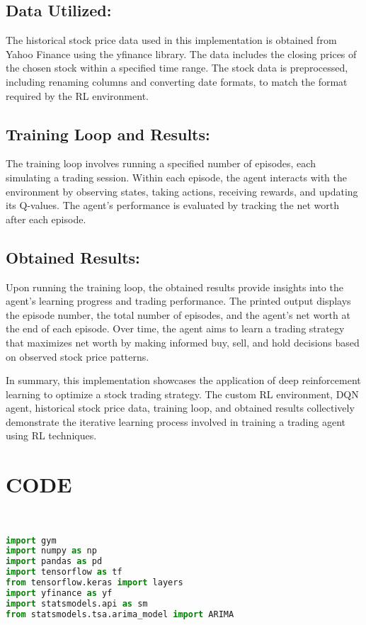 \documentclass{article}
\begin{document}
\subsection{Data Utilized:}
The historical stock price data used in this implementation is obtained from Yahoo Finance using the yfinance library. The data includes the closing prices of the chosen stock within a specified time range. The stock data is preprocessed, including renaming columns and converting date formats, to match the format required by the RL environment.

\subsection{ Training Loop and Results:}
The training loop involves running a specified number of episodes, each simulating a trading session. Within each episode, the agent interacts with the environment by observing states, taking actions, receiving rewards, and updating its Q-values. The agent's performance is evaluated by tracking the net worth after each episode.

\subsection{ Obtained Results:}
Upon running the training loop, the obtained results provide insights into the agent's learning progress and trading performance. The printed output displays the episode number, the total number of episodes, and the agent's net worth at the end of each episode. Over time, the agent aims to learn a trading strategy that maximizes net worth by making informed buy, sell, and hold decisions based on observed stock price patterns.

In summary, this implementation showcases the application of deep reinforcement learning to optimize a stock trading strategy. The custom RL environment, DQN agent, historical stock price data, training loop, and obtained results collectively demonstrate the iterative learning process involved in training a trading agent using RL techniques.




\section{CODE}

\begin{lstlisting}[language=Python]


import gym
import numpy as np
import pandas as pd
import tensorflow as tf
from tensorflow.keras import layers
import yfinance as yf
import statsmodels.api as sm
from statsmodels.tsa.arima_model import ARIMA
\end{lstlisting}
\end{document}
